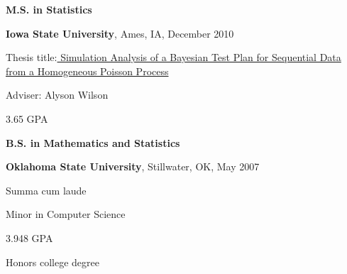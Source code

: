 \documentclass[11pt]{article}
\renewcommand{\section}[2]%
        {\pagebreak[2]\vspace{1.3\baselineskip}%
         \phantomsection\addcontentsline{toc}{section}{#1}%
         \hspace{0in}%
         \marginpar{
         \raggedright \scshape #1}#2}
\newenvironment{outerlist}[1][\enskip\textbullet]%
        {\begin{itemize}[#1]}{\end{itemize}%
         \vspace{-.6\baselineskip}}
\newenvironment{innerlist}[1][\enskip\textbullet]%
        {\begin{compactitem}[#1]}{\end{compactitem}}
\begin{document}
\vspace{0.1in}

\textbf{M.S. in Statistics}
\begin{outerlist}
	\item[] \textbf{Iowa State University}, Ames, IA, December 2010	
	\begin{innerlist}
		\item Thesis title:\href{https://github.com/rcfoster/rcfoster.github.io/blob/master/Writing/MS\%20Thesis/MS\%20Thesis.pdf}{ Simulation Analysis of a Bayesian Test Plan for Sequential Data from a Homogeneous Poisson Process}
		\item Adviser: Alyson Wilson
		\item 3.65 GPA
         \end{innerlist}
\end{outerlist}

\vspace{0.1in}

\textbf{B.S. in Mathematics and Statistics}
	\begin{outerlist}
		\item[]  \textbf{Oklahoma State University}, Stillwater, OK,  May 2007
        		\begin{innerlist}
       			\item Summa cum laude
        			\item Minor in Computer Science
                \item 3.948 GPA
		\item Honors college degree\\
        		\end{innerlist}

\end{outerlist}

\end{document}
